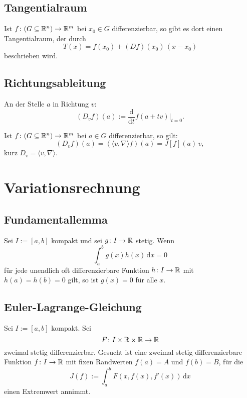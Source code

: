 \subsection{Tangentialraum}
Ist $f\colon (G\subseteq\mathbb R^n)\to\mathbb R^m$ bei $x_0\in G$ differenzierbar,
so gibt es dort einen Tangentialraum, der durch
\begin{equation}
T(x) = f(x_0)+(Df)(x_0)\,(x-x_0)
\end{equation}
beschrieben wird.

\subsection{Richtungsableitung}
\begin{definition}[Richtungsableitung]\mbox{}\newline
An der Stelle $a$ in Richtung $v$:
\begin{equation}
(D_v f)(a) := \frac{\mathrm d}{\mathrm dt}f(a+tv)\Big|_{t=0}.
\end{equation}
\end{definition}
\noindent
Ist $f\colon (G\subseteq\mathbb R^n)\to\mathbb R^m$ bei $a\in G$ differenzierbar,
so gilt:%
\begin{equation}
(D_v f)(a) = (\langle v,\nabla\rangle f)(a) = J[f](a)\,v,
\end{equation}
kurz $D_v = \langle v,\nabla\rangle$.

\section{Variationsrechnung}

\subsection{Fundamentallemma}

Sei $I:=[a,b]$ kompakt und sei $g\colon I\to\mathbb R$
stetig. Wenn 
\begin{equation}
\int_a^b g(x)h(x)\,\mathrm dx=0
\end{equation}
für jede unendlich oft differenzierbare Funktion $h\colon I\to\mathbb R$
mit $h(a)=h(b)=0$ gilt, so ist $g(x)=0$ für alle $x$.

\subsection{Euler-Lagrange-Gleichung}

Sei $I:=[a,b]$ kompakt. Sei
\begin{equation}
F\colon I\times\mathbb R\times\mathbb R\to\mathbb R
\end{equation}
zweimal stetig differenzierbar. Gesucht ist eine zweimal
stetig differenzierbare Funktion $f\colon I\to\mathbb R$ mit fixen
Randwerten $f(a)=A$ und $f(b)=B$, für die
\begin{equation}
J(f) := \int_a^b F(x,f(x),f'(x))\,\mathrm dx
\end{equation}
einen Extremwert annimmt.


